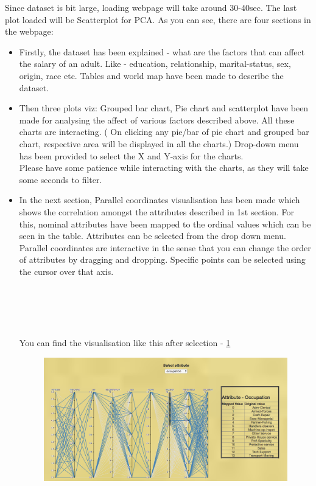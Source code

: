 \documentclass{article}
\begin{document}
Since dataset is bit large, loading webpage will take around 30-40sec. The last plot loaded will be Scatterplot for PCA. 
As you can see, there are four sections in the webpage:
\begin{itemize}
\item Firstly, the dataset has been explained - what are the factors that can affect the salary of an adult. Like - education, relationship, marital-status, sex, origin, race etc. Tables and world map have been made to describe the dataset.
\item Then three plots viz: Grouped bar chart, Pie chart and scatterplot have been made for analysing the affect of various factors described above. All these charts are interacting. ( On clicking any pie/bar of pie chart and grouped bar chart, respective area will be displayed in all the charts.) Drop-down menu has been provided to select the X and Y-axis for the charts. \\
Please have some patience while interacting with the charts, as they will take some seconds to filter.
\item In the next section, Parallel coordinates visualisation has been made which shows the correlation amongst the attributes described in 1st section. For this, nominal attributes have been mapped to the ordinal values which can be seen in the table. Attributes can be selected from the drop down menu.\\
Parallel coordinates are interactive in the sense that you can change the order of attributes by dragging and dropping. Specific points can be selected using the cursor over that axis.\\\\\\\\\\\\

You can find the visualisation like this after selection - \ref{fig:abc}

\begin{figure}[h]
\includegraphics[scale=0.5]{abc.jpg}
\label{fig:abc}
\end{figure}


\end{itemize}
\end{document}

